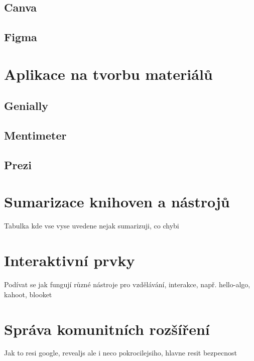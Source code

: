 \subsection{Canva}

\subsection{Figma}

\section{Aplikace na tvorbu materiálů}

\subsection{Genially}

\subsection{Mentimeter}

\subsection{Prezi}

\section{Sumarizace knihoven a nástrojů}

Tabulka kde vse vyse uvedene nejak sumarizuji, co chybi

\section{Interaktivní prvky}

Podívat se jak fungují různé nástroje pro vzdělávání, interakce, např. hello-algo, kahoot, blooket

\section{Správa komunitních rozšíření}

Jak to resi google, revealjs ale i neco pokrocilejsiho, hlavne resit bezpecnost